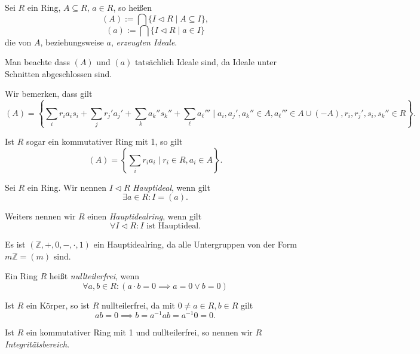 \begin{definition}
    Sei $R$ ein Ring, $A \subseteq R$, $a \in R$, so heißen
    $$ (A) := \bigcap \{ I \vartriangleleft R \mid A \subseteq I \}, $$
    $$ (a) := \bigcap \{ I \vartriangleleft R \mid a \in I \} $$
    die von $A$, beziehungsweise $a$, \emph{erzeugten Ideale}.
\end{definition}

\begin{remark}
    Man beachte dass $(A)$ und $(a)$ tatsächlich Ideale sind, da Ideale unter Schnitten abgeschlossen sind.
\end{remark}

\begin{remark}
    Wir bemerken, dass gilt
    $$ (A) = \left\{ \sum_i r_i a_i s_i + \sum_j r_j' a_j' + \sum_k a_k'' s_k'' + \sum_\ell a_\ell''' \mid a_i, a_j', a_k'' \in A, a_\ell''' \in A \cup (-A), r_i, r_j', s_i, s_k'' \in R \right\}. $$

    Ist $R$ sogar ein kommutativer Ring mit 1, so gilt
    $$ (A) = \left\{ \sum_i r_i a_i \mid r_i \in R, a_i \in A \right\}. $$
\end{remark}

\begin{definition}
    Sei $R$ ein Ring. Wir nennen $I \vartriangleleft R$ \emph{Hauptideal}, wenn gilt
    $$ \exists a \in R: I = (a). $$

    Weiters nennen wir $R$ einen \emph{Hauptidealring}, wenn gilt
    $$ \forall I \vartriangleleft R : I \text{ ist Hauptideal}. $$
\end{definition}

\begin{example}
    Es ist $(\mathbb{Z}, +, 0, -, \cdot, 1)$ ein Hauptidealring, da alle Untergruppen von der Form $m \mathbb{Z} = (m)$ sind.
\end{example}

\begin{definition}
    Ein Ring $R$ heißt \emph{nullteilerfrei}, wenn
    $$ \forall a, b \in R: (a \cdot b = 0 \implies a = 0 \lor b = 0) $$
\end{definition}

\begin{example}
    Ist $R$ ein Körper, so ist $R$ nullteilerfrei, da mit $0 \neq a \in R, b \in R$ gilt
    $$ a b = 0 \implies b = a^{-1} a b = a^{-1} 0 = 0. $$
\end{example}

\begin{definition}
    Ist $R$ ein kommutativer Ring mit 1 und nullteilerfrei, so nennen wir $R$ \emph{Integritätsbereich}.
\end{definition}

